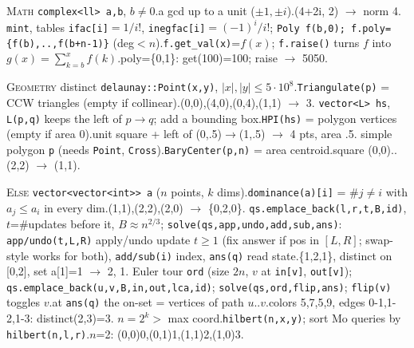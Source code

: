 {\textsc{Math}
\io \texttt{complex<ll> a,b}, $b\ne0$.\oo a gcd up to a unit ($\pm1,\pm i$).\ex (4+2i, 2) $\to$ norm 4.
\io \texttt{mint}, tables \texttt{ifac[i]}$=1/i!$, \texttt{inegfac[i]}$=(-1)^i/i!$; \texttt{Poly f(b,0); f.poly=\{f(b),..,f(b+n-1)\}} (deg$<n$).\oo \texttt{f.get\_val(x)}=$f(x)$; \texttt{f.raise()} turns $f$ into $g(x)=\sum_{k=b}^{x}f(k)$.\ex poly=\{0,1\}: get(100)=100; raise $\to$ 5050.

\textsc{Geometry}
\io distinct \texttt{delaunay::Point(x,y)}, $|x|,|y|\le5\cdot10^8$.\oo \texttt{Triangulate(p)} = CCW triangles (empty if collinear).\ex (0,0),(4,0),(0,4),(1,1) $\to$ 3.
\io \texttt{vector<L> hs}, \texttt{L(p,q)} keeps the left of $p\to q$; add a bounding box.\oo \texttt{HPI(hs)} = polygon vertices (empty if area 0).\ex unit square + left of (0,.5)$\to$(1,.5) $\to$ 4 pts, area .5.
\io simple polygon \texttt{p} (needs \texttt{Point}, \texttt{Cross}).\oo \texttt{BaryCenter(p,n)} = area centroid.\ex square (0,0)..(2,2) $\to$ (1,1).

\textsc{Else}
\io \texttt{vector<vector<int>> a} ($n$ points, $k$ dims).\oo \texttt{dominance(a)[i]} = \#$j\ne i$ with $a_j\le a_i$ in every dim.\ex (1,1),(2,2),(2,0) $\to$ \{0,2,0\}.
\io \texttt{qs.emplace\_back(l,r,t,B,id)}, $t$=\#updates before it, $B\approx n^{2/3}$; \texttt{solve(qs,app,undo,add,sub,ans)}: \texttt{app/undo(t,L,R)} apply/undo update $t\ge1$ (fix answer if pos in $[L,R]$; swap-style works for both), \texttt{add/sub(i)} index, \texttt{ans(q)} read state.\ex \{1,2,1\}, distinct on [0,2], set a[1]=1 $\to$ 2, 1.
\io Euler tour \texttt{ord} (size $2n$, $v$ at \texttt{in[v]}, \texttt{out[v]}); \texttt{qs.emplace\_back(u,v,B,in,out,lca,id)}; \texttt{solve(qs,ord,flip,ans)}; \texttt{flip(v)} toggles $v$.\oo at \texttt{ans(q)} the on-set = vertices of path $u..v$.\ex colors 5,7,5,9, edges 0-1,1-2,1-3: distinct(2,3)=3.
\io $n=2^k>$ max coord.\oo \texttt{hilbert(n,x,y)}; sort Mo queries by \texttt{hilbert(n,l,r)}.\ex $n$=2: (0,0)0,(0,1)1,(1,1)2,(1,0)3.
\par}

